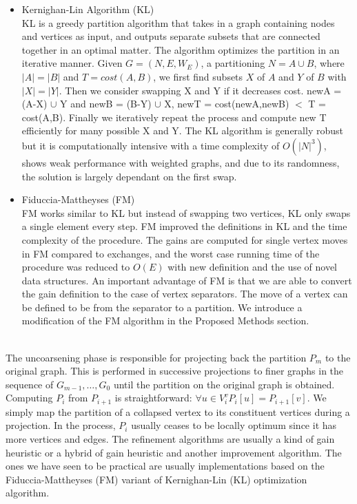 \begin{itemize}
    \item Kernighan-Lin Algorithm (KL)\\
    KL is a greedy partition algorithm that takes in a graph containing nodes and vertices as input, and outputs separate subsets that are connected together in an optimal matter. The algorithm optimizes the partition in an iterative manner. Given $G = (N,E,W_E)$, a partitioning $N = A \cup B$, where $|A| = |B|$ and $T=cost(A,B)$, we first find subsets $X$ of $A$ and $Y$ of $B$ with $|X|= |Y|$. Then we consider swapping X and Y if it decreases cost. newA = (A-X) $\cup$ Y and newB = (B-Y) $\cup$ X, newT = cost(newA,newB) $<$ T = cost(A,B). Finally we iteratively repeat the process and compute new T efficiently for many possible X and Y. The KL algorithm is generally robust but it is computationally intensive with a time complexity of $O(|N|^{3})$, shows weak performance with weighted graphs, and due to its randomness, the solution is largely dependant on the first swap. \\
    \item Fiduccia-Mattheyses (FM) \\
    FM works similar to KL but instead of swapping two vertices, KL only swaps a single element every step. FM improved the definitions in KL and the time complexity of the procedure. The gains are computed for single vertex moves in FM compared to exchanges, and the worst case running time of the procedure was reduced to $O(E)$ with new definition and the use of novel data structures. An important advantage of FM is that we are able to convert the gain definition to the case of vertex separators. The move of a vertex can be defined to be from the separator to a partition. We introduce a modification of the FM algorithm in the Proposed Methods section. \\
\end{itemize}
 \\
The uncoarsening phase is responsible for projecting back the partition $P_m$ to the original
graph. This is performed in successive projections to finer graphs in the sequence of
$G_{m-1},\dots,G_0$ until the partition on the original graph is obtained.
Computing $P_{i}$ from $P_{i+1}$ is straightforward: $\forall u \in V_i^v
P_i[u] = P_{i+1}[v]$. We simply map the partition of a collapsed vertex to its constituent vertices during a projection. In the process, $P_i$ usually ceases to be locally optimum since it has more vertices and edges.  The refinement algorithms are usually a kind of gain heuristic or a hybrid of gain heuristic and another improvement algorithm. The ones we have seen to be practical are usually implementations based on the Fiduccia-Mattheyses (FM) variant of Kernighan-Lin (KL) optimization algorithm.